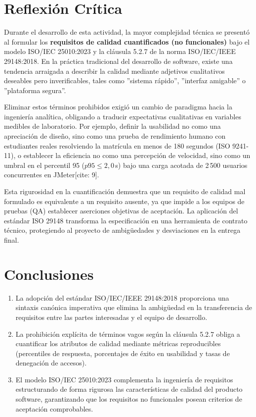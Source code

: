 \documentclass[conference]{IEEEtran}
\begin{document}
	\section{Reflexión Crítica}
	Durante el desarrollo de esta actividad, la mayor complejidad técnica se presentó al formular los \textbf{requisitos de calidad cuantificados (no funcionales)} bajo el modelo ISO/IEC 25010:2023 y la cláusula 5.2.7 de la norma ISO/IEC/IEEE 29148:2018. En la práctica tradicional del desarrollo de software, existe una tendencia arraigada a describir la calidad mediante adjetivos cualitativos deseables pero inverificables, tales como ''sistema rápido'', ''interfaz amigable'' o ''plataforma segura''.
	
	Eliminar estos términos prohibidos exigió un cambio de paradigma hacia la ingeniería analítica, obligando a traducir expectativas cualitativas en variables medibles de laboratorio. Por ejemplo, definir la usabilidad no como una apreciación de diseño, sino como una prueba de rendimiento humano con estudiantes reales resolviendo la matrícula en menos de 180 segundos (ISO 9241-11), o establecer la eficiencia no como una percepción de velocidad, sino como un umbral en el percentil 95 ($p95 \le 2{,}0$\,s) bajo una carga acotada de 2\,500 usuarios concurrentes en JMeter[cite: 9].
	
	Esta rigurosidad en la cuantificación demuestra que un requisito de calidad mal formulado es equivalente a un requisito ausente, ya que impide a los equipos de pruebas (QA) establecer aserciones objetivas de aceptación. La aplicación del estándar ISO 29148 transforma la especificación en una herramienta de contrato técnico, protegiendo al proyecto de ambigüedades y desviaciones en la entrega final.
	
	\section{Conclusiones}
	\begin{enumerate}
		\item La adopción del estándar ISO/IEC/IEEE 29148:2018 proporciona una sintaxis canónica imperativa que elimina la ambigüedad en la transferencia de requisitos entre las partes interesadas y el equipo de desarrollo.
		\item La prohibición explícita de términos vagos según la cláusula 5.2.7 obliga a cuantificar los atributos de calidad mediante métricas reproducibles (percentiles de respuesta, porcentajes de éxito en usabilidad y tasas de denegación de accesos).
		\item El modelo ISO/IEC 25010:2023 complementa la ingeniería de requisitos estructurando de forma rigurosa las características de calidad del producto software, garantizando que los requisitos no funcionales posean criterios de aceptación comprobables.
	\end{enumerate}
	
\end{document}
